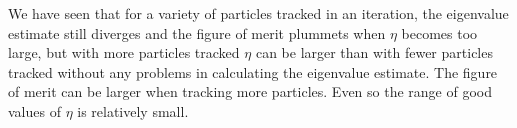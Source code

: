 We have seen that for a variety of particles tracked in an iteration, the eigenvalue estimate still diverges and the figure of merit plummets when $\eta$ becomes too large, but with more particles tracked $\eta$ can be larger than with fewer particles tracked without any problems in calculating the eigenvalue estimate.  The figure of merit can be larger when tracking more particles.  Even so the range of good values of $\eta$ is relatively small.  
